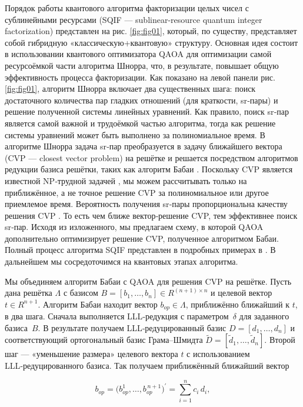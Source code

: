 Порядок работы квантового алгоритма факторизации целых чисел с сублинейными
ресурсами (SQIF --- sublinear-resource quantum integer factorization) представлен
на рис. \ref{fig:fig01}, который, по существу, представляет собой гибридную
«классическую+квантовую» структуру. Основная идея состоит в использовании
квантового оптимизатора QAOA для оптимизации самой ресурсоёмкой части алгоритма
Шнорра, что, в результате, повышает общую эффективность процесса факторизации.
Как показано на левой панели рис. \ref{fig:fig01}, алгоритм Шнорра включает два
существенных шага: поиск достаточного количества пар гладких отношений (для
краткости, sr‑пары) и решение полученной системы линейных уравнений. Как
правило, поиск sr‑пар является самой важной и трудоёмкой частью алгоритма,
тогда как решение системы уравнений может быть выполнено за полиномиальное
время. В алгоритме Шнорра \cite{cite_31} задача sr‑пар преобразуется в задачу
ближайшего вектора (CVP --- closest vector problem) на решётке и решается
посредством алгоритмов редукции базиса решётки, таких как алгоритм Бабаи
\cite{cite_32}. Поскольку CVP является известной NP‑трудной задачей
\cite{cite_33}, мы можем рассчитывать только на приближённое, а не точное
решение CVP за полиномиальное или другое приемлемое время. Вероятность
получения sr‑пары пропорциональна качеству решения CVP \cite{cite_29}. То есть
чем ближе вектор‑решение CVP, тем эффективнее поиск sr‑пар. Исходя из
изложенного, мы предлагаем схему, в которой QAOA дополнительно оптимизирует
решение CVP, полученное алгоритмом Бабаи. Полный процесс алгоритма SQIF
представлен в подробных примерах в \cite{cite_31}. В дальнейшем мы
сосредоточимся на квантовых этапах алгоритма.

Мы объединяем алгоритм Бабаи с QAOA для решения CVP на решётке. Пусть дана
решётка $\Lambda$ с базисом $B=[b_1,\ldots,b_n]\in {R}^{(n+1)\times n}$
и целевой вектор ${t}\in{R}^{n+1}$. Алгоритм Бабаи находит вектор
${b}_{{op}}\in\Lambda$, приближённо ближайший к ${t}$, в два шага. Сначала
выполняется LLL‑редукция с параметром~$\delta$ для заданного базиса~$B$. В
результате получаем LLL‑редуцированный базис $D=[d_1,\ldots,d_n]$ и
соответствующий ортогональный базис Грама–Шмидта
$\widetilde{D}=[\widetilde{d}_1,\ldots,\widetilde{d}_n]$. Второй шаг —
«уменьшение размера» целевого вектора ${t}$ с использованием
LLL‑редуцированного базиса. Так получаем приближённый ближайший вектор

\begin{equation}
    {b}_{{op}}
    = \bigl(b^{1}_{{op}},\ldots,b^{\,n+1}_{{op}}\bigr)^{\prime}
    = \sum_{i=1}^{n} c_{i}\,d_{i},
\end{equation}

